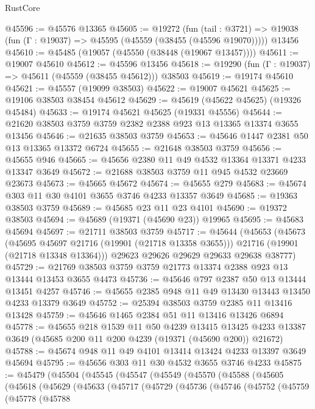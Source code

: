 \begin{lexlean}{RustCore}
\begin{coremodule}
@45596 := @45576 @13365
@45605 := @19272
    (fun (tail : @3721) => @19038 (fun (Γ : @19037) => @45595 (@45559 (@38455 (@45596 @19070)))))
    @13456
@45610 := @45485 (@19057 (@45550 (@38448 (@19067 @13457))))
@45611 := @19007 @45610
@45612 := @45596 @13456
@45618 := @19290 (fun (Γ : @19037) => @45611 (@45559 (@38455 @45612))) @38503
@45619 := @19174 @45610
@45621 := @45557 (@19099 @38503)
@45622 := @19007 @45621
@45625 := @19106 @38503 @38454 @45612
@45629 := @45619 (@45622 @45625) (@19326 @45484)
@45633 := @19174 @45621 @45625 (@19331 @45556)
@45644 := @21620 @38503 @3759 @3759 @2382 @2388 @923 @13 @13365 @13374 @3655 @13456
@45646 := @21635 @38503 @3759
@45653 := @45646 @1447 @2381 @50 @13 @13365 @13372 @6724
@45655 := @21648 @38503 @3759
@45656 := @45655 @946
@45665 := @45656 @2380 @11 @49 @4532 @13364 @13371 @4233 @13347 @3649
@45672 := @21688 @38503 @3759 @11 @945 @4532 @23669 @23673
@45673 := @45665 @45672
@45674 := @45655 @279
@45683 := @45674 @303 @11 @30 @4101 @3655 @3746 @4233 @13357 @3649
@45685 := @19363 @38503 @3759
@45689 := @45685 @23 @11 @23 @4101
@45690 := @19372 @38503
@45694 := @45689 (@19371 (@45690 @23)) @19965
@45695 := @45683 @45694
@45697 := @21711 @38503 @3759
@45717 := @45644
    (@45653
      (@45673
        (@45695 @45697 @21716 (@19901 (@21718 @13358 @3655)))
        @21716
        (@19901 (@21718 @13348 @13364)))
      @29623
      @29626
      @29629
      @29633
      @29638
      @38777)
@45729 := @21769 @38503 @3759 @3759 @21773 @13374 @2388 @923 @13 @13444 @13453 @3655 @4473
@45736 := @45646 @797 @2387 @50 @13 @13444 @13451 @4257
@45746 := @45655 @2385 @948 @11 @49 @13430 @13443 @13450 @4233 @13379 @3649
@45752 := @25394 @38503 @3759 @2385 @11 @13416 @13428
@45759 := @45646 @1465 @2384 @51 @11 @13416 @13426 @6894
@45778 := @45655
    @218
    @1539
    @11
    @50
    @4239
    @13415
    @13425
    @4233
    @13387
    @3649
    (@45685 @200 @11 @200 @4239 (@19371 (@45690 @200)) @21672)
@45788 := @45674 @948 @11 @49 @4101 @13414 @13424 @4233 @13397 @3649 @45694
@45795 := @45656 @303 @11 @30 @4532 @3655 @3746 @4233
@45875 := @45479
    (@45504
      (@45545
        (@45547
          (@45549
            (@45570
              (@45588
                (@45605
                  (@45618
                    (@45629
                      (@45633
                        (@45717
                          (@45729
                            (@45736
                              (@45746
                                (@45752
                                  (@45759
                                    (@45778
                                      (@45788

\end{coremodule}
\end{lexlean}
